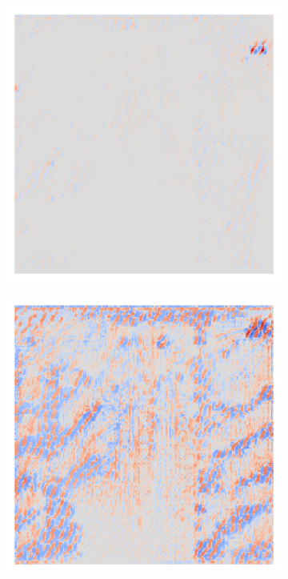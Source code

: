 \begin{figure}[H]
\begin{subfigure}{0.19\linewidth}
        \end{subfigure}\hfill%
        \begin{subfigure}{0.19\linewidth}
            \centering
            \includegraphics[height=1\linewidth]{01-images/05-resultate/uap_resnet18/uap2-resnet18-covidx_data-n200-robustificationslevel0.png}
        \end{subfigure}\hfill%
        \begin{subfigure}{0.19\linewidth}
            \centering
            \includegraphics[height=1\linewidth]{01-images/05-resultate/uap_resnet18/uap3-resnet18-covidx_data-n200-robustificationslevel0.png}

\end{subfigure}
\end{figure}
